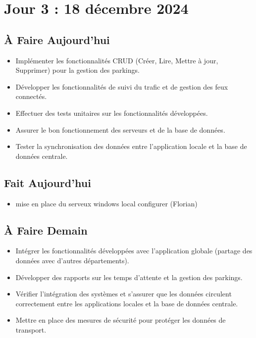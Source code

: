 \documentclass[a4paper,12pt]{report}
\begin{document}
\section{Jour 3 : 18 décembre 2024}

\subsection{À Faire Aujourd'hui}
\begin{itemize}
    \item Implémenter les fonctionnalités CRUD (Créer, Lire, Mettre à jour, Supprimer) pour la gestion des parkings.
    \item Développer les fonctionnalités de suivi du trafic et de gestion des feux connectés.
    \item Effectuer des tests unitaires sur les fonctionnalités développées.
    \item Assurer le bon fonctionnement des serveurs et de la base de données.
    \item Tester la synchronisation des données entre l'application locale et la base de données centrale.
\end{itemize}

\subsection{Fait Aujourd'hui}
\begin{itemize}
    \item mise en place du serveux windows local configurer (Florian)
\end{itemize}

\subsection{À Faire Demain}
\begin{itemize}
    \item Intégrer les fonctionnalités développées avec l'application globale (partage des données avec d'autres départements).
    \item Développer des rapports sur les temps d'attente et la gestion des parkings.
    \item Vérifier l'intégration des systèmes et s'assurer que les données circulent correctement entre les applications locales et la base de données centrale.
    \item Mettre en place des mesures de sécurité pour protéger les données de transport.
\end{itemize}
\end{document}
